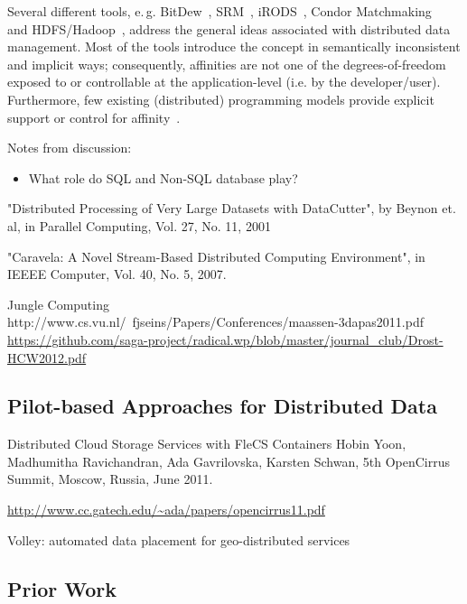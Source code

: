 \documentclass{sig-alternate}
\begin{document}
Several different tools, e.\,g. BitDew~\cite{Fedak:2008:BPE:1413370.1413416},
SRM~\cite{srm-ogf}, iRODS~\cite{Rajasekar:2010:IPI:1855046}, Condor
Matchmaking~\cite{Raman:1998:MDR:822083.823222} and HDFS/Hadoop~\cite{hadoop},
address the general ideas associated with distributed data management. Most of
the tools introduce the concept in semantically inconsistent and implicit
ways; consequently, affinities are not one of the degrees-of-freedom exposed
to or controllable at the application-level (i.e. by the developer/user).
Furthermore, few existing (distributed) programming models provide explicit
support or control for affinity~\cite{ideas}.


Notes from discussion:
\begin{itemize}
	\item What role do SQL and Non-SQL database play?
\end{itemize}

"Distributed Processing of Very Large Datasets with
DataCutter", by Beynon et. al, in Parallel Computing, Vol. 27, No. 11,
2001 

"Caravela: A Novel Stream-Based Distributed Computing
Environment", in IEEEE Computer, Vol. 40, No. 5, 2007.

Jungle Computing \\
http://www.cs.vu.nl/~fjseins/Papers/Conferences/maassen-3dapas2011.pdf \\
\url{https://github.com/saga-project/radical.wp/blob/master/journal_club/Drost-HCW2012.pdf}



\subsection{Pilot-based Approaches for Distributed Data}

Distributed Cloud Storage Services with FleCS Containers Hobin Yoon,
Madhumitha Ravichandran, Ada Gavrilovska, Karsten Schwan, 5th
OpenCirrus Summit, Moscow, Russia, June 2011.

\url{http://www.cc.gatech.edu/~ada/papers/opencirrus11.pdf}


Volley: automated data placement for geo-distributed services

\subsection{Prior Work}
\end{document}

